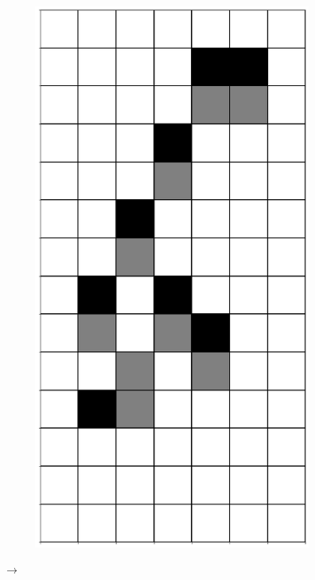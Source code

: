 \documentclass[12pt]{article}
\numberwithin{figure}{section} %
\begin{document}
\begin{figure}[H]
        \begin{subfigure}{0.3\textwidth}
     		\centering
     		\includegraphics[angle=270,width=\linewidth]{Section4/12.2}
     		\subcaption{}
   	\end{subfigure}
      	{\LARGE$\xrightarrow{}$}
      	\newline

\end{figure}
\end{document}
